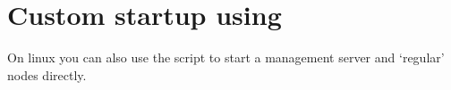 

\section{Custom startup using \texorpdfstring{}{scalarisctl}}

On linux you can also use the  script to start a
management server and `regular' nodes directly.
\begin{lstlisting}[language=sh]
%> ./bin/scalarisctl -h
\end{lstlisting}

